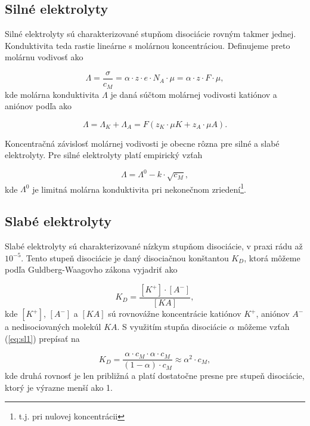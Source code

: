 \documentclass{article}
\begin{document}
\subsection{Silné elektrolyty}
Silné elektrolyty sú charakterizované stupňom disociácie rovným takmer jednej. Konduktivita teda rastie lineárne s molárnou koncentráciou. Definujeme preto molárnu vodivosť ako \cite{prak}

\begin{equation}
    \Lambda = \frac{\sigma}{c_M} = \alpha{\cdot}z{\cdot}e{\cdot}N_A{\cdot}\mu = \alpha{\cdot}z{\cdot}F{\cdot}\mu,
\end{equation}
kde molárna konduktivita $\Lambda$ je daná súčtom molárnej vodivosti katiónov a aniónov podľa \cite{prak} ako

\begin{equation}
    \Lambda = {\Lambda}_K + {\Lambda}_A = F(z_K{\cdot}{\mu}K + z_A{\cdot}{\mu}A).
\end{equation}

Koncentračná závislosť molárnej vodivosti je obecne rôzna pre silné a slabé elektrolyty. Pre silné elektrolyty platí empirický vzťah \cite{prak}

\begin{equation} \label{eq:zried}
    \Lambda = {\Lambda}^0 - k{\cdot}\sqrt{c_M},
\end{equation}
kde ${\Lambda}^0$ je limitná molárna konduktivita pri nekonečnom zriedení\footnote{t.j. pri nulovej koncentrácii}.

\subsection{Slabé elektrolyty}
Slabé elektrolyty sú charakterizované nízkym stupňom disociácie, v praxi rádu až $10^{-5}$. Tento stupeň disociácie je daný disociačnou konštantou $K_D$, ktorá môžeme podľa Guldberg-Waagovho zákona vyjadriť ako \cite{prak}

\begin{equation} \label{eq:sl1}
	K_D = \frac{[K^+]{\cdot}[A^-]}{[KA]},
\end{equation} 
kde $[K^+]$, $[A^-]$ a $[KA]$ sú rovnovážne koncentrácie katiónov $K^+$, aniónov $A^-$ a nedisociovaných molekúl $KA$. S využitím stupňa disociácie $\alpha$ môžeme vzťah (\ref{eq:sl1}) prepísať na \cite{prak}

\begin{equation}
    K_D = \frac{\alpha{\cdot}c_M{\cdot}\alpha{\cdot}c_M}{(1-\alpha){\cdot}c_M} \approx {\alpha}^2{\cdot}c_M,
\end{equation}
kde druhá rovnosť je len približná a platí dostatočne presne pre stupeň disociácie, ktorý je výrazne menší ako 1.
\end{document}
